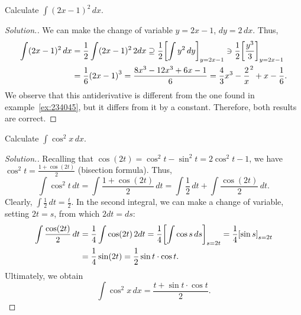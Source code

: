\begin{example}
Calculate $\int (2x-1)^2\, dx$.
\end{example}
\begin{proof}[Solution.]
We can make the change of variable $y=2x-1$, $dy = 2\, dx$. Thus,
\begin{align*}
\int (2x-1)^2\, dx 
&= \frac 1 2 \int (2x-1)^2\, 2dx
\supseteq \frac 1 2 {\left[ \int y^2\, dy \right]}_{y=2x-1}
\ni \frac 1 2 {\left[ \frac{y^3}{3} \right]}_{y=2x-1}\\
&= \frac 1 6 {\left( 2x-1 \right)}^3 = \frac{8x^3 - 12x^3 + 6 x - 1}{6}
= \frac 4 3 x^3 - \frac 2 x^2 + x - \frac 1 6.
\end{align*}
We observe that this antiderivative is different from the one found in
example~\ref{ex:234045}, but it differs from it by a constant. Therefore, both
results are correct.
\end{proof}
\begin{example}
Calculate
$\int \cos^2 x \, dx$.
\end{example}
\begin{proof}[Solution.]
Recalling that $\cos(2t) = \cos^2 t - \sin^2 t = 2\cos^2 t - 1$, we have $\cos^2
t = \frac{1+\cos(2t)}2$ (bisection formula). Thus,
\[
\int \cos^2 t\, dt
= \int\frac{1+\cos(2t)}{2}\, dt
= \int \frac 1 2 \, dt + \int \frac{\cos(2t)}{2}\, dt.
\]
Clearly, $\int \frac 1 2 \, dt  = \frac t 2$.
In the second integral, we can make a change of variable, setting $2t=s$, from
which $2dt = ds$:
\begin{align*}
\int \frac{\cos(2t)}{2}\, dt
&= \frac 1 4 \int \cos(2t)\, 2dt
= \frac 1 4 {\left[ \int \cos s \, ds \right]}_{s=2t}
= \frac 1 4 {\left[ \sin s \right]}_{s=2t}\\
&= \frac 1 4 \sin(2t)
= \frac{1}{2}\sin t \cdot \cos t.
\end{align*}
Ultimately, we obtain
\[
  \int \cos^2 x \, dx = \frac{t+\sin t \cdot \cos t}{2}.
\]
\end{proof}



